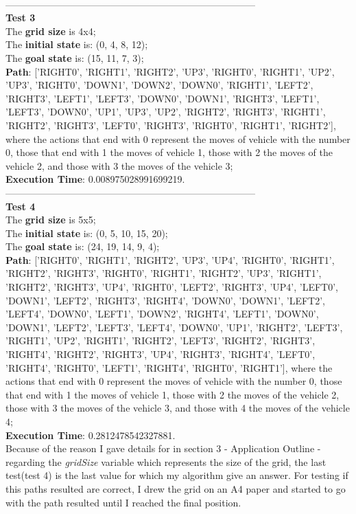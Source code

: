 \documentclass[14pt]{article}
\begin{document}
\\------------------------------------------------------------------------------
\vspace{0.5 mm}
\\\textbf{Test 3}
\\The \textbf{grid size} is 4x4;
\\The \textbf{initial state} is: (0, 4, 8, 12);
\\The \textbf{goal state} is: (15, 11, 7, 3);
\\\textbf{Path}: ['RIGHT0', 'RIGHT1', 'RIGHT2', 'UP3', 'RIGHT0', 'RIGHT1', 'UP2', 'UP3', 'RIGHT0', 'DOWN1', 'DOWN2', 'DOWN0', 'RIGHT1', 'LEFT2', 'RIGHT3', 'LEFT1', 'LEFT3', 'DOWN0', 'DOWN1', 'RIGHT3', 'LEFT1', 'LEFT3', 'DOWN0', 'UP1', 'UP3', 'UP2', 'RIGHT2', 'RIGHT3', 'RIGHT1', 'RIGHT2', 'RIGHT3', 'LEFT0', 'RIGHT3', 'RIGHT0', 'RIGHT1', 'RIGHT2'], where the actions that end with 0 represent the moves of vehicle with the number 0, those that end with 1 the moves of vehicle 1, those with 2 the moves of the vehicle 2, and those with 3 the moves of the vehicle 3;
\\\textbf{Execution Time}: 0.008975028991699219.
\vspace{0.5 mm}
\\------------------------------------------------------------------------------
\vspace{0.5 mm}
\\\textbf{Test 4}
\\The \textbf{grid size} is 5x5;
\\The \textbf{initial state} is: (0, 5, 10, 15, 20);
\\The \textbf{goal state} is: (24, 19, 14, 9, 4);
\\\textbf{Path}: ['RIGHT0', 'RIGHT1', 'RIGHT2', 'UP3', 'UP4', 'RIGHT0', 'RIGHT1', 'RIGHT2', 'RIGHT3', 'RIGHT0', 'RIGHT1', 'RIGHT2', 'UP3', 'RIGHT1', 'RIGHT2', 'RIGHT3', 'UP4', 'RIGHT0', 'LEFT2', 'RIGHT3', 'UP4', 'LEFT0', 'DOWN1', 'LEFT2', 'RIGHT3', 'RIGHT4', 'DOWN0', 'DOWN1', 'LEFT2', 'LEFT4', 'DOWN0', 'LEFT1', 'DOWN2', 'RIGHT4', 'LEFT1', 'DOWN0', 'DOWN1', 'LEFT2', 'LEFT3', 'LEFT4', 'DOWN0', 'UP1', 'RIGHT2', 'LEFT3', 'RIGHT1', 'UP2', 'RIGHT1', 'RIGHT2', 'LEFT3', 'RIGHT2', 'RIGHT3', 'RIGHT4', 'RIGHT2', 'RIGHT3', 'UP4', 'RIGHT3', 'RIGHT4', 'LEFT0', 'RIGHT4', 'RIGHT0', 'LEFT1', 'RIGHT4', 'RIGHT0', 'RIGHT1'], where the actions that end with 0 represent the moves of vehicle with the number 0, those that end with 1 the moves of vehicle 1, those with 2 the moves of the vehicle 2, those with 3 the moves of the vehicle 3, and those with 4 the moves of the vehicle 4;
\\\textbf{Execution Time}: 0.2812478542327881.
\vspace{2.5 mm}
\\Because of the reason I gave details for in section 3 - Application Outline - regarding the \textit{gridSize} variable which represents the size of the grid, the last test(test 4) is the last value for which my algorithm give an answer. For testing if this paths resulted are correct, I drew the grid on an A4 paper and started to go with the path resulted until I reached the final position.
\newpage
\end{document}
